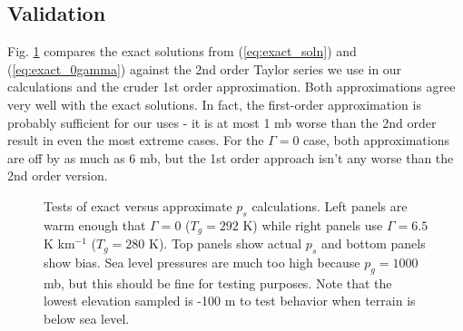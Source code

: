 \subsection{Validation}

Fig. \ref{fig:exactVSapprox} compares the exact solutions from (\ref{eq:exact_soln}) and (\ref{eq:exact_0gamma}) against the 2nd order Taylor series we use in our calculations and the cruder 1st order approximation. Both approximations agree very well with the exact solutions. In fact, the first-order approximation is probably sufficient for our uses - it is at most 1 mb worse than the 2nd order result in even the most extreme cases. For the $\Gamma=0$ case, both approximations are off by as much as 6 mb, but the 1st order approach isn't any worse than the 2nd order version. 
\begin{figure}[ht]
\noindent
\centering
{}
\caption{Tests of exact versus approximate $p_s$ calculations. Left panels are warm enough that $\Gamma=0$ ($T_g=292$ K) while right panels use $\Gamma=6.5$ K km$^{-1}$ ($T_g=280$ K). Top panels show actual $p_s$ and bottom panels show bias. Sea level pressures are much too high because $p_g=1000$ mb, but this should be fine for testing purposes. Note that the lowest elevation sampled is -100 m to test behavior when terrain is below sea level.} 
\label{fig:exactVSapprox}
\end{figure}

